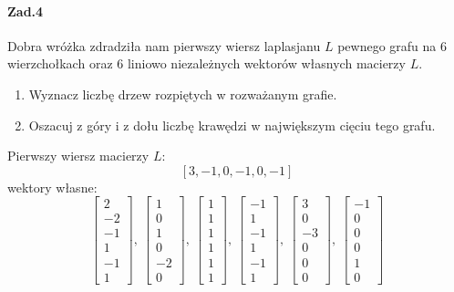 \documentclass[a4paper,12pt]{article}
\theoremstyle{definition}%
\theoremstyle{definition}
\theoremstyle{problem}
\begin{document}
\paragraph{Zad.4} Dobra wróżka zdradziła nam pierwszy wiersz laplasjanu $L$ pewnego grafu na $6$ wierzchołkach oraz $6$ liniowo niezależnych wektorów własnych macierzy $L$.
\begin{enumerate}[label=\alph*)]
\item Wyznacz liczbę drzew rozpiętych w rozważanym grafie.
\item Oszacuj z góry i z dołu liczbę krawędzi w największym cięciu tego grafu.
\end{enumerate}
Pierwszy wiersz macierzy $L:$
$$[3,-1,0,-1,0,-1]$$
wektory własne:
$$\begin{bmatrix}
2\\-2\\-1\\1\\-1\\1
\end{bmatrix},\ \begin{bmatrix}
1\\0\\1\\0\\-2\\0
\end{bmatrix},\ \begin{bmatrix}
1\\1\\1\\1\\1\\1
\end{bmatrix},\ \begin{bmatrix}
-1\\1\\-1\\1\\-1\\1
\end{bmatrix},\ \begin{bmatrix}
3\\0\\-3\\0\\0\\0
\end{bmatrix},\ \begin{bmatrix}
-1\\0\\0\\0\\1\\0
\end{bmatrix}$$
\end{document}
